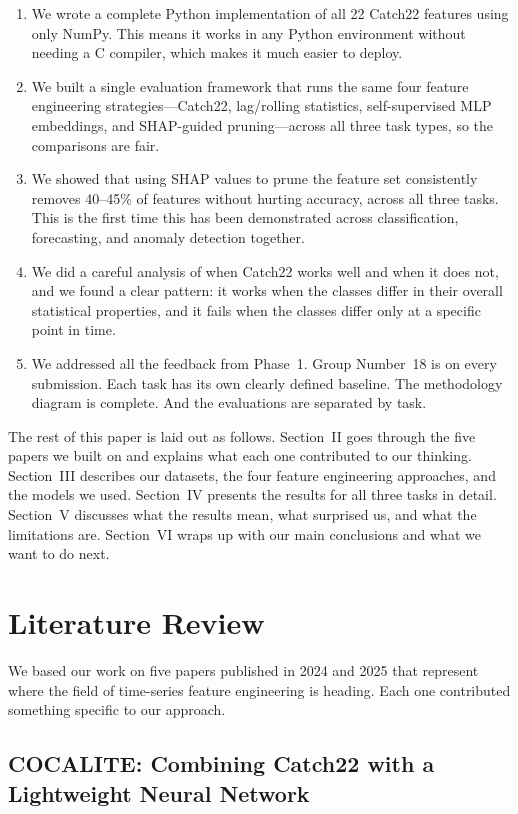 \documentclass[10pt,conference]{IEEEtran}
\begin{document}
\begin{enumerate}
  \item We wrote a complete Python implementation of all 22 Catch22 features using only NumPy. This means it works in any Python environment without needing a C compiler, which makes it much easier to deploy.
  \item We built a single evaluation framework that runs the same four feature engineering strategies---Catch22, lag/rolling statistics, self-supervised MLP embeddings, and SHAP-guided pruning---across all three task types, so the comparisons are fair.
  \item We showed that using SHAP values to prune the feature set consistently removes 40--45\% of features without hurting accuracy, across all three tasks. This is the first time this has been demonstrated across classification, forecasting, and anomaly detection together.
  \item We did a careful analysis of when Catch22 works well and when it does not, and we found a clear pattern: it works when the classes differ in their overall statistical properties, and it fails when the classes differ only at a specific point in time.
  \item We addressed all the feedback from Phase~1. Group Number~18 is on every submission. Each task has its own clearly defined baseline. The methodology diagram is complete. And the evaluations are separated by task.
\end{enumerate}

The rest of this paper is laid out as follows. Section~II goes through the five papers we built on and explains what each one contributed to our thinking. Section~III describes our datasets, the four feature engineering approaches, and the models we used. Section~IV presents the results for all three tasks in detail. Section~V discusses what the results mean, what surprised us, and what the limitations are. Section~VI wraps up with our main conclusions and what we want to do next.

\section{Literature Review}

We based our work on five papers published in 2024 and 2025 that represent where the field of time-series feature engineering is heading. Each one contributed something specific to our approach.

\subsection{COCALITE: Combining Catch22 with a Lightweight Neural Network}
\end{document}
